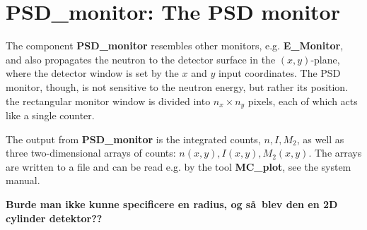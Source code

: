 
\section{PSD\_monitor: The PSD monitor}


The component {\bf PSD\_monitor} resembles other monitors, e.g. 
{\bf E\_Monitor}, and also propagates the neutron to the detector
surface in the $(x,y)$-plane, where the detector window is set
by the $x$ and $y$ input coordinates.
The PSD monitor, though, is not sensitive to the neutron energy, but
rather its position. the rectangular monitor window is divided
into $n_x \times n_y$ pixels, each of which acts like a single
counter.

The output from {\bf PSD\_monitor} is the integrated counts, $n, I, M_2$, 
as well as 
three two-dimensional arrays of counts: $n(x,y), I(x,y), M_2(x,y)$.
The arrays are written to a file and can be read e.g. by the tool
{\bf MC\_plot}, see the system manual.

{\bf Burde man ikke kunne specificere en radius, 
og s\aa\ blev den en 2D cylinder detektor??}